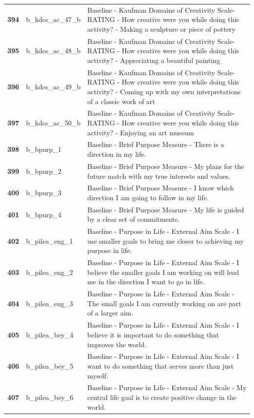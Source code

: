 \documentclass[
  letterpaper,
  DIV=11,
  numbers=noendperiod]{scrartcl}
\begin{document}
\begin{longtable}[t]{>{}cll}
\textbf{394} & b\_kdcs\_ac\_47\_b & Baseline - Kaufman Domains of Creativity Scale-RATING - How creative were you while doing this activity? - Making a sculpture or piece of pottery\\
\textbf{395} & b\_kdcs\_ac\_48\_b & Baseline - Kaufman Domains of Creativity Scale-RATING - How creative were you while doing this activity? - Appreciating a beautiful painting\\
\addlinespace
\textbf{396} & b\_kdcs\_ac\_49\_b & Baseline - Kaufman Domains of Creativity Scale-RATING - How creative were you while doing this activity? - Coming up with my own interpretations of a classic work of art\\
\textbf{397} & b\_kdcs\_ac\_50\_b & Baseline - Kaufman Domains of Creativity Scale-RATING - How creative were you while doing this activity? - Enjoying an art museum\\
\textbf{398} & b\_bpurp\_1 & Baseline - Brief Purpose Measure - There is a direction in my life.\\
\textbf{399} & b\_bpurp\_2 & Baseline - Brief Purpose Measure - My plans for the future match with my true interests and values.\\
\textbf{400} & b\_bpurp\_3 & Baseline - Brief Purpose Measure - I know which direction I am going to follow in my life.\\
\addlinespace
\textbf{401} & b\_bpurp\_4 & Baseline - Brief Purpose Measure - My life is guided by a clear set of commitments.\\
\textbf{402} & b\_pilea\_eng\_1 & Baseline - Purpose in Life - External Aim Scale - I use smaller goals to bring me closer to achieving my purpose in life.\\
\textbf{403} & b\_pilea\_eng\_2 & Baseline - Purpose in Life - External Aim Scale - I believe the smaller goals I am working on will lead me in the direction I want to go in life.\\
\textbf{404} & b\_pilea\_eng\_3 & Baseline - Purpose in Life - External Aim Scale - The small goals I am currently working on are part of a larger aim.\\
\textbf{405} & b\_pilea\_bey\_4 & Baseline - Purpose in Life - External Aim Scale - I believe it is important to do something that improves the world.\\
\addlinespace
\textbf{406} & b\_pilea\_bey\_5 & Baseline - Purpose in Life - External Aim Scale - I want to do something that serves more than just myself.\\
\textbf{407} & b\_pilea\_bey\_6 & Baseline - Purpose in Life - External Aim Scale - My central life goal is to create positive change in the world.\\

\end{longtable}
\end{document}
